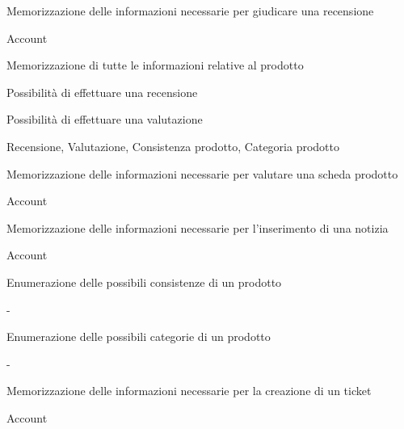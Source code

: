 
{\begin{itemWork}
	\item Memorizzazione delle informazioni necessarie per giudicare una recensione
\end{itemWork}}
{Account}


{\begin{itemWork}
	\item Memorizzazione di tutte le informazioni relative al prodotto
	\item Possibilità di effettuare una recensione
	\item Possibilità di effettuare una valutazione
\end{itemWork}}
{Recensione, Valutazione, Consistenza prodotto, Categoria prodotto}


{\begin{itemWork}
	\item Memorizzazione delle informazioni necessarie per valutare una scheda prodotto
\end{itemWork}}
{Account}


{\begin{itemWork}
	\item Memorizzazione delle informazioni necessarie per l'inserimento di una notizia
\end{itemWork}}
{Account}


{\begin{itemWork}
	\item Enumerazione delle possibili consistenze di un prodotto
\end{itemWork}}
{-}


{\begin{itemWork}
	\item Enumerazione delle possibili categorie di un prodotto
\end{itemWork}}
{-}


{\begin{itemWork}
	\item Memorizzazione delle informazioni necessarie per la creazione di un ticket
\end{itemWork}}
{Account}

